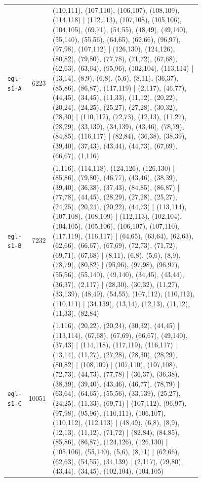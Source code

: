\begin{landscape}
\begin{longtable}{lr>{\tiny\raggedright\arraybackslash}p{0.78\linewidth}}
\texttt{egl-s1-A} & 6223 & (110,111), (107,110), (106,107), (108,109), (114,118) | (112,113), (107,108), (105,106), (104,105), (69,71), (54,55), (48,49), (49,140), (55,140), (55,56), (64,65), (62,66), (96,97), (97,98), (107,112) | (126,130), (124,126), (80,82), (79,80), (77,78), (71,72), (67,68), (62,63), (63,64), (95,96), (102,104), (113,114) | (13,14), (8,9), (6,8), (5,6), (8,11), (36,37), (85,86), (86,87), (117,119) | (2,117), (46,77), (44,45), (34,45), (11,33), (11,12), (20,22), (20,24), (24,25), (25,27), (27,28), (30,32), (28,30) | (110,112), (72,73), (12,13), (11,27), (28,29), (33,139), (34,139), (43,46), (78,79), (84,85), (116,117) | (82,84), (36,38), (38,39), (39,40), (37,43), (43,44), (44,73), (67,69), (66,67), (1,116) \\[2pt]
\texttt{egl-s1-B} & 7232 & (1,116), (114,118), (124,126), (126,130) | (85,86), (79,80), (46,77), (43,46), (38,39), (39,40), (36,38), (37,43), (84,85), (86,87) | (77,78), (44,45), (28,29), (27,28), (25,27), (24,25), (20,24), (20,22), (44,73) | (113,114), (107,108), (108,109) | (112,113), (102,104), (104,105), (105,106), (106,107), (107,110), (117,119), (116,117) | (64,65), (63,64), (62,63), (62,66), (66,67), (67,69), (72,73), (71,72), (69,71), (67,68) | (8,11), (6,8), (5,6), (8,9), (78,79), (80,82) | (95,96), (97,98), (96,97), (55,56), (55,140), (49,140), (34,45), (43,44), (36,37), (2,117) | (28,30), (30,32), (11,27), (33,139), (48,49), (54,55), (107,112), (110,112), (110,111) | (34,139), (13,14), (12,13), (11,12), (11,33), (82,84) \\[2pt]
\texttt{egl-s1-C} & 10051 & (1,116), (20,22), (20,24), (30,32), (44,45) | (113,114), (67,68), (67,69), (66,67), (49,140), (37,43) | (114,118), (117,119), (116,117) | (13,14), (11,27), (27,28), (28,30), (28,29), (80,82) | (108,109) | (107,110), (107,108), (72,73), (44,73), (77,78) | (36,37), (36,38), (38,39), (39,40), (43,46), (46,77), (78,79) | (63,64), (64,65), (55,56), (33,139), (25,27), (24,25), (11,33), (69,71) | (107,112), (96,97), (97,98), (95,96), (110,111), (106,107), (110,112), (112,113) | (48,49), (6,8), (8,9), (12,13), (11,12), (71,72) | (82,84), (84,85), (85,86), (86,87), (124,126), (126,130) | (105,106), (55,140), (5,6), (8,11) | (62,66), (62,63), (54,55), (34,139) | (2,117), (79,80), (43,44), (34,45), (102,104), (104,105) \\[2pt]

\end{longtable}
\end{landscape}
